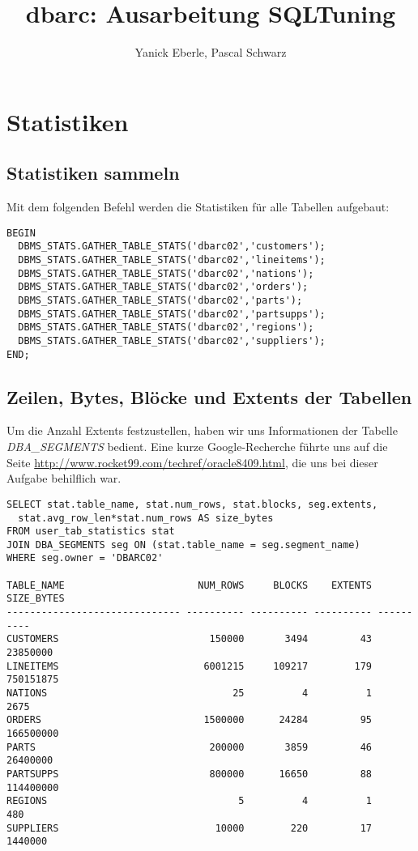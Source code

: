 \documentclass[11pt,a4paper,parskip=half]{scrartcl}
\title{dbarc: Ausarbeitung SQLTuning}
\author{Yanick Eberle, Pascal Schwarz}
\begin{document}
\maketitle
\vfill
\tableofcontents

\section{Statistiken}
\subsection{Statistiken sammeln}
Mit dem folgenden Befehl werden die Statistiken für alle Tabellen aufgebaut:
\begin{lstlisting}
BEGIN
  DBMS_STATS.GATHER_TABLE_STATS('dbarc02','customers');
  DBMS_STATS.GATHER_TABLE_STATS('dbarc02','lineitems');
  DBMS_STATS.GATHER_TABLE_STATS('dbarc02','nations');
  DBMS_STATS.GATHER_TABLE_STATS('dbarc02','orders');
  DBMS_STATS.GATHER_TABLE_STATS('dbarc02','parts');
  DBMS_STATS.GATHER_TABLE_STATS('dbarc02','partsupps');
  DBMS_STATS.GATHER_TABLE_STATS('dbarc02','regions');
  DBMS_STATS.GATHER_TABLE_STATS('dbarc02','suppliers');
END;
\end{lstlisting}

\subsection{Zeilen, Bytes, Blöcke und Extents der Tabellen}
Um die Anzahl Extents festzustellen, haben wir uns Informationen der Tabelle \emph{DBA\_SEGMENTS} bedient. Eine kurze Google-Recherche führte uns auf die Seite \url{http://www.rocket99.com/techref/oracle8409.html}, die uns bei dieser Aufgabe behilflich war.

\begin{lstlisting}
SELECT stat.table_name, stat.num_rows, stat.blocks, seg.extents,
  stat.avg_row_len*stat.num_rows AS size_bytes
FROM user_tab_statistics stat
JOIN DBA_SEGMENTS seg ON (stat.table_name = seg.segment_name)
WHERE seg.owner = 'DBARC02'

TABLE_NAME                       NUM_ROWS     BLOCKS    EXTENTS SIZE_BYTES
------------------------------ ---------- ---------- ---------- ----------
CUSTOMERS                          150000       3494         43   23850000 
LINEITEMS                         6001215     109217        179  750151875 
NATIONS                                25          4          1       2675 
ORDERS                            1500000      24284         95  166500000 
PARTS                              200000       3859         46   26400000 
PARTSUPPS                          800000      16650         88  114400000 
REGIONS                                 5          4          1        480 
SUPPLIERS                           10000        220         17    1440000 
\end{lstlisting}
\end{document}
